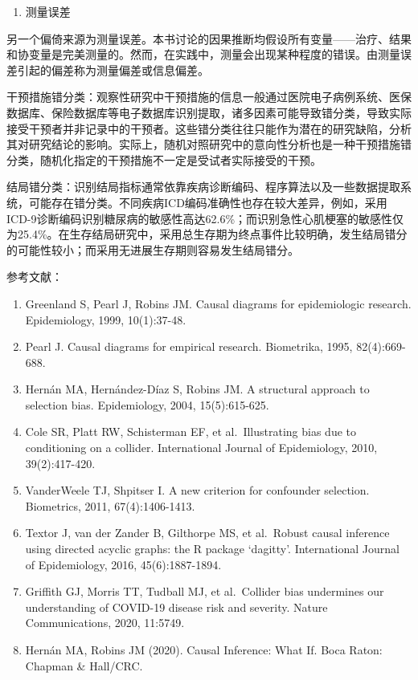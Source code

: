 \documentclass[
  chinese-hans,
  letterpaper,
  DIV=11,
  numbers=noendperiod]{scrreprt}
\providecommand{\tightlist}{%
  \setlength{\itemsep}{0pt}\setlength{\parskip}{0pt}}
\begin{document}
\begin{enumerate}
\def\labelenumi{\arabic{enumi}.}
\setcounter{enumi}{2}
\tightlist
\item
  测量误差
\end{enumerate}

另一个偏倚来源为测量误差。本书讨论的因果推断均假设所有变量------治疗、结果和协变量是完美测量的。然而，在实践中，测量会出现某种程度的错误。由测量误差引起的偏差称为测量偏差或信息偏差。

干预措施错分类：观察性研究中干预措施的信息一般通过医院电子病例系统、医保数据库、保险数据库等电子数据库识别提取，诸多因素可能导致错分类，导致实际接受干预者并非记录中的干预者。这些错分类往往只能作为潜在的研究缺陷，分析其对研究结论的影响。实际上，随机对照研究中的意向性分析也是一种干预措施错分类，随机化指定的干预措施不一定是受试者实际接受的干预。

结局错分类：识别结局指标通常依靠疾病诊断编码、程序算法以及一些数据提取系统，可能存在错分类。不同疾病ICD编码准确性也存在较大差异，例如，采用ICD-9诊断编码识别糖尿病的敏感性高达62.6\%；而识别急性心肌梗塞的敏感性仅为25.4\%。在生存结局研究中，采用总生存期为终点事件比较明确，发生结局错分的可能性较小；而采用无进展生存期则容易发生结局错分。

参考文献：

\begin{enumerate}
\def\labelenumi{\arabic{enumi}.}
\item
  Greenland S, Pearl J, Robins JM. Causal diagrams for epidemiologic
  research. Epidemiology, 1999, 10(1):37-48.
\item
  Pearl J. Causal diagrams for empirical research. Biometrika, 1995,
  82(4):669-688.
\item
  Hernán MA, Hernández-Díaz S, Robins JM. A structural approach to
  selection bias. Epidemiology, 2004, 15(5):615-625.
\item
  Cole SR, Platt RW, Schisterman EF, et al.~Illustrating bias due to
  conditioning on a collider. International Journal of Epidemiology,
  2010, 39(2):417-420.
\item
  VanderWeele TJ, Shpitser I. A new criterion for confounder selection.
  Biometrics, 2011, 67(4):1406-1413.
\item
  Textor J, van der Zander B, Gilthorpe MS, et al.~Robust causal
  inference using directed acyclic graphs: the R package `dagitty'.
  International Journal of Epidemiology, 2016, 45(6):1887-1894.
\item
  Griffith GJ, Morris TT, Tudball MJ, et al.~Collider bias undermines
  our understanding of COVID-19 disease risk and severity. Nature
  Communications, 2020, 11:5749.
\item
  Hernán MA, Robins JM (2020). Causal Inference: What If. Boca Raton:
  Chapman \& Hall/CRC.
\end{enumerate}
\end{document}
